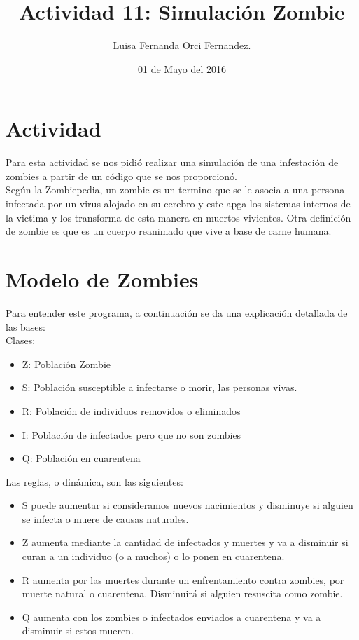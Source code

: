 \documentclass[12pt,letterpaper]{article}
\begin{document}
\title{Actividad 11: Simulaci\'on Zombie}
\author{Luisa Fernanda Orci Fernandez.}
\date{01 de Mayo del 2016}

\maketitle

\section*{Actividad}
Para esta actividad se nos pidió realizar una simulación de una infestación de zombies a partir de un código que se nos proporcionó.\\ 
Según la Zombiepedia\cite{1}, un zombie es un termino que se le asocia a una persona infectada por un virus alojado en su cerebro y este apga los sistemas internos de la victima y los transforma de esta manera en muertos vivientes. Otra definición de zombie es que es un cuerpo reanimado que vive a base de carne humana.


\section*{Modelo de Zombies}
Para entender este programa, a continuación se da una explicación detallada de las bases:\\

Clases: 
\begin{itemize}

\item Z: Población Zombie
\item S: Población susceptible a infectarse o morir, las personas vivas.
\item R: Población de individuos removidos o eliminados
\item I: Población de infectados pero que no son zombies
\item Q: Población en cuarentena

\end{itemize}

Las reglas, o dinámica, son las siguientes:
\begin{itemize}

\item S puede aumentar si consideramos nuevos nacimientos y disminuye si alguien se infecta o muere de causas naturales.
\item  Z aumenta mediante la cantidad de infectados y muertes y va a disminuir si curan a un individuo (o a muchos) o lo ponen en cuarentena.
\item  R aumenta por las muertes durante un enfrentamiento contra zombies, por muerte natural o cuarentena. Disminuirá si alguien resuscita como zombie.
\item Q aumenta con los zombies o infectados enviados a cuarentena y va a disminuir si estos mueren.
 
\end{itemize}
\end{document}
